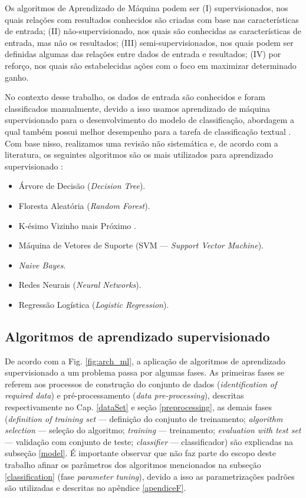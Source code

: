 \documentclass[
	12pt,				%
	oneside,			%
	a4paper,			%
	english,			%
	brazil				%
	]{abntex2ppgsi}
\begin{document}
Os algoritmos de Aprendizado de Máquina podem ser (I) supervisionados, nos quais relações com resultados conhecidos são criadas com base nas características de entrada; (II) não-supervisionado, nos quais são conhecidas as características de entrada, mas não os resultados; (III) semi-supervisionados, nos quais podem ser definidas algumas das relações entre dados de entrada e resultados; (IV) por reforço, nos quais são estabelecidas ações com o foco em maximizar determinado ganho.

No contexto desse trabalho, os dados de entrada são conhecidos e foram classificados manualmente, devido a isso usamos aprendizado de máquina supervisionado para o desenvolvimento do modelo de classificação, abordagem a qual também possui melhor desempenho para a tarefa de classificação textual \cite{dwivedi2016automatic}.  Com base nisso, realizamos uma revisão não sistemática e, de acordo com a literatura, os seguintes algoritmos são os mais utilizados para aprendizado supervisionado \cite{kotsiantis2007supervised, dwivedi2016automatic, narayanan2017survey}:

\begin{itemize}
\item Árvore de Decisão (\textit{Decision Tree}).
\item Floresta Aleatória (\textit{Random Forest}).
\item K-ésimo Vizinho mais Próximo .
\item Máquina de Vetores de Suporte ({SVM --- \textit{Support Vector Machine}}).
\item \textit{Naive Bayes}.
\item Redes Neurais (\textit{Neural Networks}).
\item Regressão Logística (\textit{Logistic Regression}).
\end{itemize}

\subsection{Algoritmos de aprendizado supervisionado}
\label{supervisionedLearning}

De acordo com a Fig. \ref{fig:arch_ml}, a aplicação de algoritmos de aprendizado supervisionado a um problema passa por algumas fases.
As primeiras fases se referem aos processos de construção do conjunto de dados (\textit{identification of required data}) e pré-processamento (\textit{data pre-processing}), descritas respectivamente no Cap. \ref{dataSet} e seção \ref{preprocessing}, as demais fases (\textit{definition of training set} --- definição do conjunto de treinamento; \textit{algorithm selection} --- seleção do algoritmo; \textit{training} --- treinamento; \textit{evaluation with test set} --- validação com conjunto de teste; \textit{classifier} --- classificador) são explicadas na subseção \ref{model}. É importante observar que não faz parte do escopo deste trabalho afinar os parâmetros dos algoritmos mencionados na subseção \ref{classification} (fase \textit{parameter tuning}), devido a isso as parametrizações padrões são utilizadas e descritas no apêndice \ref{apendiceF}.
\end{document}
